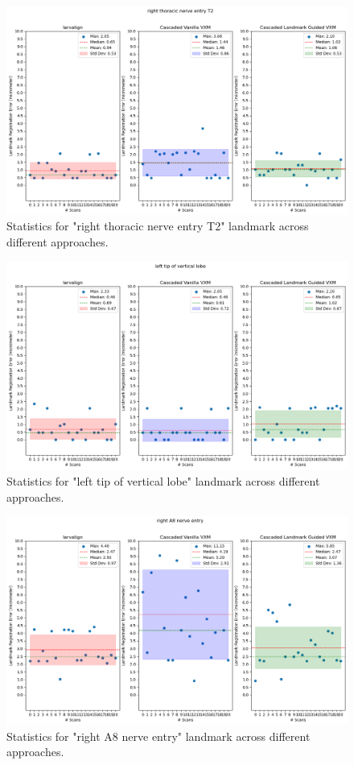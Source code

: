 \documentclass{report}
\begin{document}
\begin{figure}[h!]
	\centering
	\includegraphics[width=0.7\columnwidth]{resources/chapter5_fresh/output/right thoracic nerve entry T2.png}
	\caption{Statistics for "right thoracic nerve entry T2" landmark across different approaches.}
	\label{fig:landmark5}
\end{figure}

\begin{figure}[h!]
	\centering
	\includegraphics[width=0.7\columnwidth]{resources/chapter5_fresh/output/left tip of vertical lobe.png}
	\caption{Statistics for "left tip of vertical lobe" landmark across different approaches.}
	\label{fig:landmark6}
\end{figure}

\begin{figure}[h!]
	\centering
	\includegraphics[width=0.7\columnwidth]{resources/chapter5_fresh/output/right A8 nerve entry.png}
	\caption{Statistics for "right A8 nerve entry" landmark across different approaches.}
	\label{fig:landmark7}
\end{figure}
\end{document}
